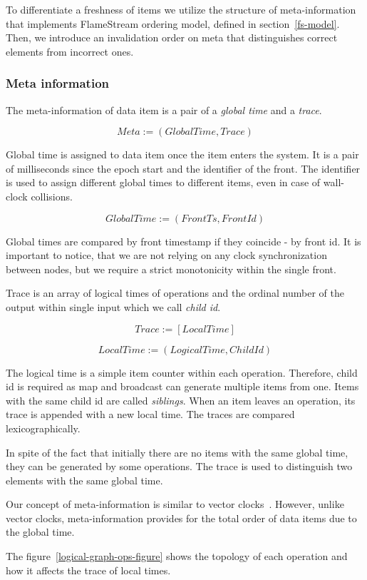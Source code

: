 To differentiate a freshness of items we utilize the structure of meta-information that implements FlameStream ordering model, defined in section~\ref{fs-model}. Then, we introduce an invalidation order on meta that distinguishes correct elements from incorrect ones.

\subsubsection{Meta information}
The meta-information of data item is a pair of a {\it global time} and a {\it trace}.

\[Meta := (GlobalTime, Trace)\]

Global time is assigned to data item once the item enters the system. It is a pair of milliseconds since the epoch start and the identifier of the front. The identifier is used to assign different global times to different items, even in case of wall-clock collisions. 

\[GlobalTime := (FrontTs, FrontId)\]

Global times are compared by front timestamp if they coincide - by front id. It is important to notice, that we are not relying on any clock synchronization between nodes, but we require a strict monotonicity within the single front.

Trace is an array of logical times of operations and the ordinal number of the output within single input which we call {\it child id}. 

\[Trace := [LocalTime]\]

\[LocalTime := (LogicalTime, ChildId)\]

The logical time is a simple item counter within each operation. Therefore, child id is required as map and broadcast can generate multiple items from one. Items with the same child id are called {\it siblings}. When an item leaves an operation, its trace is appended with a new local time. The traces are compared lexicographically.

In spite of the fact that initially there are no items with the same global time, they can be generated by some operations. The trace is used to distinguish two elements with the same global time.

Our concept of meta-information is similar to vector clocks~\cite{fidge1988timestamps, mattern88virtualtime}. However, unlike vector clocks, meta-information provides for the total order of data items due to the global time.

The figure~\ref{logical-graph-ops-figure} shows the topology of each operation and how it affects the trace of local times.

